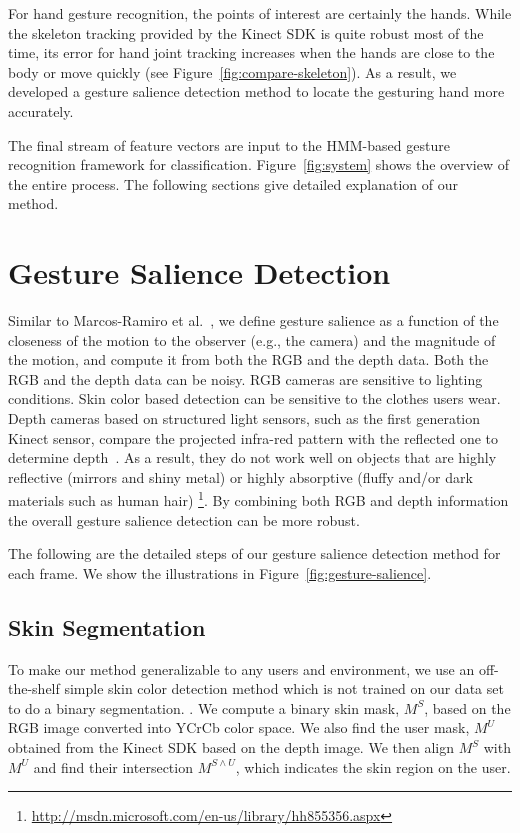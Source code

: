 \documentclass{acm_proc_article-sp}
\begin{document}
For hand gesture recognition, the points of interest are certainly the hands. While the skeleton tracking provided
by the Kinect SDK is quite robust most of the time, its error for hand joint tracking increases when
the hands are close to the body or move quickly (see Figure~\ref{fig:compare-skeleton}). As a result, we
developed a gesture salience detection method to locate the gesturing hand more accurately.

The final stream of feature vectors are input to the HMM-based
gesture recognition framework for classification. Figure~\ref{fig:system} shows the overview of the entire process.
The following sections give detailed explanation of our method.  

\section{Gesture Salience Detection}
Similar to Marcos-Ramiro et al.~\cite{marcos2013}, we define gesture salience as a function of 
the closeness of the motion to the observer (e.g., the camera) and the magnitude of the motion,
and compute it from both the RGB and the depth data. Both the RGB and the depth data can be noisy. RGB cameras are sensitive to lighting conditions.
Skin color based detection can be sensitive to the clothes users wear. Depth cameras based on 
structured light sensors, such as the first generation Kinect sensor, compare the projected infra-red pattern
with the reflected one to determine depth~\cite{welsh:2011}. As a result, they do not work well on 
objects that are highly reflective (mirrors and shiny metal) or highly absorptive (fluffy and/or dark materials such as human hair)
\footnote{\url{http://msdn.microsoft.com/en-us/library/hh855356.aspx}}. By combining both RGB and
depth information
the overall gesture salience detection can be more robust.

The following are the detailed steps of our gesture salience detection method for each frame. 
We show the illustrations in Figure~\ref{fig:gesture-salience}. 

\subsection{Skin Segmentation}
To make our method generalizable to any users and environment, we use an off-the-shelf simple skin color detection method which is not trained on our data set to do a binary segmentation. 
. We compute a binary skin mask, $M^S$, based on the RGB image converted into YCrCb
color space.  We also find the user mask, $M^U$ obtained from the Kinect SDK based on the depth image. 
We then align $M^S$ with $M^U$ and find their intersection $M^{S\wedge U}$, which indicates the skin region on the user.
\end{document}
